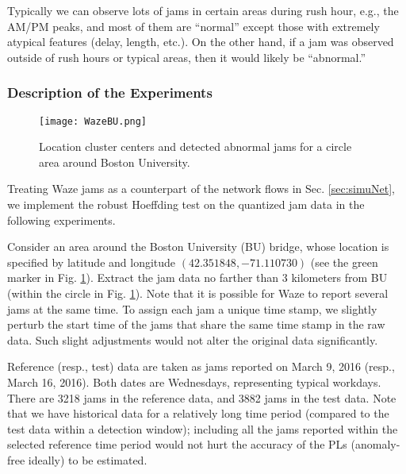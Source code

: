 \documentclass[10pt, twocolumn]{IEEEtran}
\begin{document}
Typically we can observe lots of jams in certain areas during rush hour,
e.g., the AM/PM peaks, and most of them are ``normal'' except those with
extremely atypical features (delay, length, etc.). On the other hand, if
a jam was observed outside of rush hours or typical areas, then it would
likely be ``abnormal.''

\subsubsection{Description of the Experiments}

\begin{figure}[t]
	\centering
	\texttt{[image: WazeBU.png]}
	\caption{Location cluster centers and detected abnormal jams for
          a circle area around Boston University.}
	\label{fig:locClus}
\end{figure}

Treating Waze jams as a counterpart of the network flows in
Sec. \ref{sec:simuNet}, we implement the robust Hoeffding test on the
quantized jam data in the following experiments.

Consider an area around the Boston University (BU) bridge, whose
location is specified by latitude and longitude $(42.351848,
-71.110730)$ (see the green marker in Fig. \ref{fig:locClus}). Extract
the jam data no farther than 3 kilometers from BU (within the circle in
Fig. \ref{fig:locClus}). Note that it is possible for Waze to report
several jams at the same time. To assign each jam a unique time stamp,
we slightly perturb the start time of the jams that share the same time
stamp in the raw data. Such slight adjustments would not alter the
original data significantly.

Reference (resp., test) data are taken as jams reported on March 9, 2016
(resp., March 16, 2016). Both dates are Wednesdays, representing typical
workdays. There are 3218 jams in the reference data, and 3882 jams in
the test data.  Note that we have historical data for a relatively long
time period (compared to the test data within a detection window);
including all the jams reported within the selected reference time
period would not hurt the accuracy of the PLs (anomaly-free ideally) to
be estimated.
\end{document}
